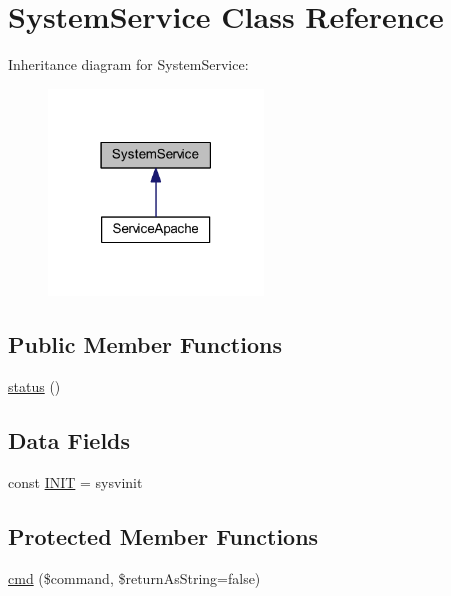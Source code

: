 \hypertarget{class_system_service}{}\section{System\+Service Class Reference}
\label{class_system_service}


Inheritance diagram for System\+Service\+:
\nopagebreak
\begin{figure}[H]
\begin{center}
\leavevmode
\includegraphics[width=162pt]{class_system_service__inherit__graph}
\end{center}
\end{figure}
\subsection*{Public Member Functions}
\begin{DoxyCompactItemize}
\item 
\hyperlink{class_system_service_a19e49aea71e41a8bd6076bc45169e4a3}{status} ()
\end{DoxyCompactItemize}
\subsection*{Data Fields}
\begin{DoxyCompactItemize}
\item 
const \hyperlink{class_system_service_a57a69f62cb572acac15fa0e1a6cac3ee}{I\+N\+I\+T} = \textquotesingle{}sysvinit\textquotesingle{}
\end{DoxyCompactItemize}
\subsection*{Protected Member Functions}
\begin{DoxyCompactItemize}
\item 
\hyperlink{class_system_service_a6fa4814448a8e7d262c91c4d999d0699}{cmd} (\$command, \$return\+As\+String=false)
\end{DoxyCompactItemize}
